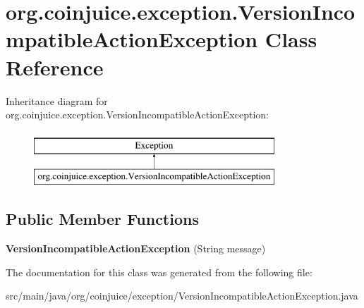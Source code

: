 \hypertarget{classorg_1_1coinjuice_1_1exception_1_1_version_incompatible_action_exception}{\section{org.\-coinjuice.\-exception.\-Version\-Incompatible\-Action\-Exception Class Reference}
\label{classorg_1_1coinjuice_1_1exception_1_1_version_incompatible_action_exception}
}
Inheritance diagram for org.\-coinjuice.\-exception.\-Version\-Incompatible\-Action\-Exception\-:\begin{figure}[H]
\begin{center}
\leavevmode
\includegraphics[height=2.000000cm]{classorg_1_1coinjuice_1_1exception_1_1_version_incompatible_action_exception}
\end{center}
\end{figure}
\subsection*{Public Member Functions}
\begin{DoxyCompactItemize}
\item 
\hypertarget{classorg_1_1coinjuice_1_1exception_1_1_version_incompatible_action_exception_a76b4e631b4100d71b22dc0e0818ef0ac}{{\bfseries Version\-Incompatible\-Action\-Exception} (String message)}\label{classorg_1_1coinjuice_1_1exception_1_1_version_incompatible_action_exception_a76b4e631b4100d71b22dc0e0818ef0ac}

\end{DoxyCompactItemize}


The documentation for this class was generated from the following file\-:\begin{DoxyCompactItemize}
\item 
src/main/java/org/coinjuice/exception/Version\-Incompatible\-Action\-Exception.\-java\end{DoxyCompactItemize}

